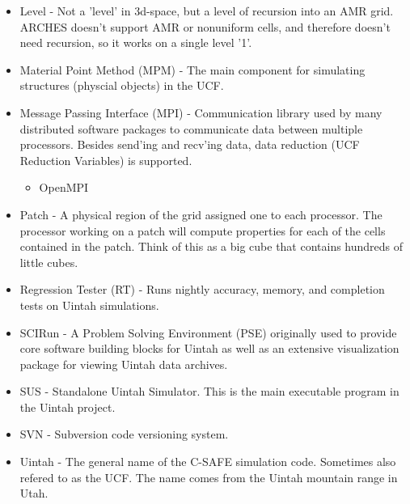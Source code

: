 \begin{itemize}
\item Level - Not a 'level' in 3d-space, but a level of recursion into an
  AMR grid.  ARCHES doesn't support AMR or nonuniform cells, and
  therefore doesn't need recursion, so it works on a single level '1'.

\item Material Point Method (MPM) - The main component for simulating
  structures (physcial objects) in the UCF.

\item Message Passing Interface (MPI) - Communication library used by many
  distributed software packages to communicate data between multiple
  processors.  Besides send'ing and recv'ing data, data
  reduction (UCF Reduction Variables) is supported. 
  \begin{itemize}
    \item OpenMPI
  \end{itemize}

\item Patch - A physical region of the grid assigned one to each
  processor.  The processor working on a patch will compute properties
  for each of the cells contained in the patch.  Think of this as a big
  cube that contains hundreds of little cubes.

\item Regression Tester (RT) - Runs nightly accuracy, memory, and
  completion tests on Uintah simulations.


\item SCIRun - A Problem Solving Environment (PSE) originally used to
  provide core software building blocks for Uintah as well as an
  extensive visualization package for viewing Uintah data archives.

\item SUS - Standalone Uintah Simulator.  This is the main executable
  program in the Uintah project.

\item SVN - Subversion code versioning system.

\item Uintah - The general name of the C-SAFE simulation code.
  Sometimes also refered to as the UCF.  The name comes from the
  Uintah mountain range in Utah.


\end{itemize}
